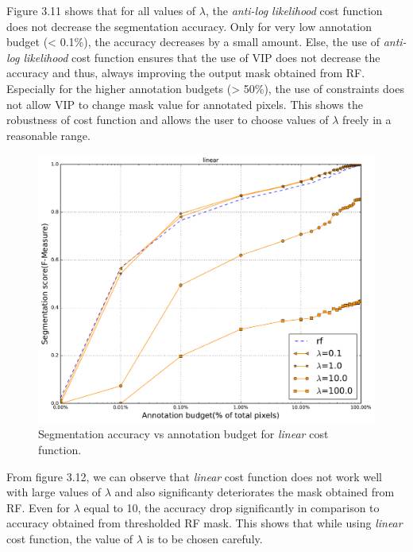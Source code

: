Figure 3.11 shows that for all values of $\lambda$, the \textit{anti-log likelihood} cost function does not decrease the segmentation accuracy. Only for very low annotation budget (< 0.1\%), the accuracy decreases by a small amount. Else, the use of \textit{anti-log likelihood} cost function ensures that the use of VIP does not decrease the accuracy and thus, always improving the output mask obtained from RF. Especially for the higher annotation budgets (> 50\%), the use of constraints does not allow VIP to change mask value for annotated pixels. This shows the robustness of cost function and allows the user to choose values of $\lambda$ freely in a reasonable range. 

\begin{figure}[h!] \label{fig:rf_vip2}
\centering
 \includegraphics[width=0.75\linewidth]{figures/linear.pdf} 
\caption{Segmentation accuracy vs annotation budget for \textit{linear} cost function.}
\end{figure}



From figure 3.12, we can observe that \textit{linear} cost function does not work well with large values of $\lambda$ and also significanty deteriorates the mask obtained from RF. Even for $\lambda$ equal to 10, the accuracy drop significantly in comparison to accuracy obtained from thresholded RF mask. This shows that while using \textit{linear} cost function, the value of $\lambda$ is to be chosen carefuly. 


